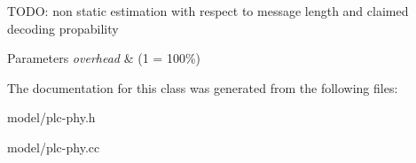 \-T\-O\-D\-O\-: non static estimation with respect to message length and claimed decoding propability


\begin{DoxyParams}{\-Parameters}
{\em overhead} & (1 = 100\%) \\
\hline
\end{DoxyParams}


\-The documentation for this class was generated from the following files\-:\begin{DoxyCompactItemize}
\item 
model/plc-\/phy.\-h\item 
model/plc-\/phy.\-cc\end{DoxyCompactItemize}
